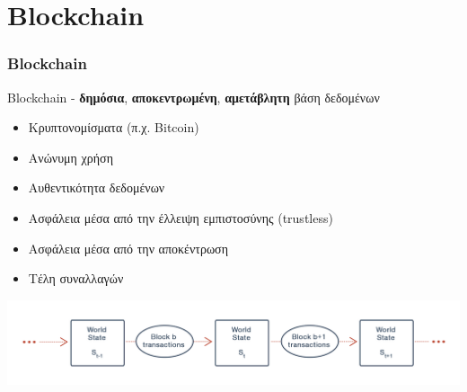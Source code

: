 \section{Blockchain}
\begin{frame}
	\frametitle{Blockchain}
	Blockchain - \textbf{δημόσια}, \textbf{αποκεντρωμένη}, \textbf{αμετάβλητη} βάση δεδομένων
	\begin{itemize}
		\item Κρυπτονομίσματα (π.χ. Bitcoin)
		\item Ανώνυμη χρήση
		\item Αυθεντικότητα δεδομένων
		\item Ασφάλεια μέσα από την έλλειψη εμπιστοσύνης (trustless)
		\item Ασφάλεια μέσα από την αποκέντρωση
		\item Τέλη συναλλαγών
	\end{itemize}
	\centering
	\includegraphics[scale=0.1]{assets/figures/blockchain-world-state}
\end{frame}
